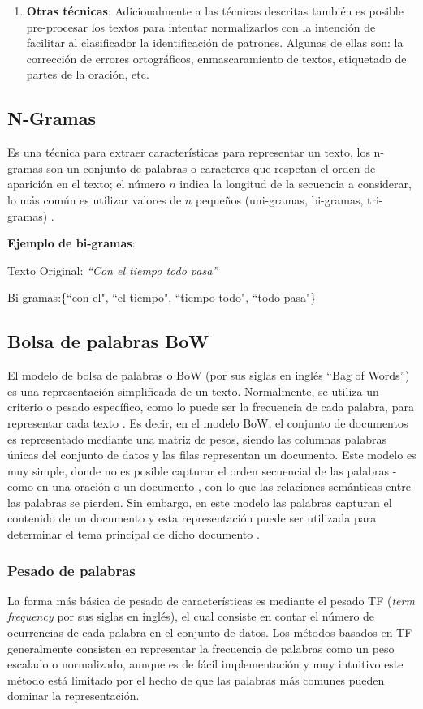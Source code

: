 \begin{enumerate}
\item  \textbf{Otras técnicas}: Adicionalmente a  las técnicas descritas también es posible pre-procesar los textos para intentar normalizarlos con la intención de facilitar al clasificador la identificación de patrones. Algunas de ellas son: la corrección de errores ortográficos, enmascaramiento de textos, etiquetado de partes de la oración, etc.

\end{enumerate}


\subsection{N-Gramas}
Es una técnica para extraer características para representar un texto, los n-gramas son un conjunto de palabras o caracteres que respetan el orden de aparición en el texto; el número $n$ indica la longitud de la secuencia a considerar, lo más común es utilizar valores de $n$ pequeños (uni-gramas, bi-gramas, tri-gramas) \citep{kowsari2019text}. 

\textbf{Ejemplo de bi-gramas}: 

Texto Original: \textit{``Con el tiempo todo pasa''}

Bi-gramas:\{``con el", ``el tiempo", ``tiempo todo", ``todo pasa"\}


\subsection{Bolsa de palabras BoW}
El modelo de bolsa de palabras o BoW (por sus siglas en inglés ``Bag of Words'') es una representación simplificada de un texto. Normalmente, se utiliza un criterio o pesado específico, como lo puede ser la frecuencia de cada palabra, para representar cada texto . Es decir, en el modelo BoW, el conjunto de documentos es representado mediante una matriz de pesos, siendo las columnas palabras únicas del conjunto de datos y las filas representan un documento. Este modelo es muy simple, donde no es posible capturar el orden secuencial de las palabras -como en una oración o un documento-, con lo que las relaciones semánticas entre las palabras se pierden. Sin embargo, en este modelo las palabras capturan el contenido de un documento y esta representación puede ser utilizada para determinar el tema principal de dicho documento \citep{kowsari2019text}.


\subsubsection{Pesado de palabras}La forma más básica de pesado de características es mediante el pesado TF (\textit{term frequency} por sus siglas en inglés), el cual consiste en contar el número de ocurrencias de cada palabra en el conjunto de datos. Los métodos basados en TF generalmente consisten en representar la frecuencia de palabras como un peso escalado o normalizado, aunque es de fácil implementación y muy intuitivo este método está limitado por el hecho de que las palabras más comunes pueden dominar la representación.

